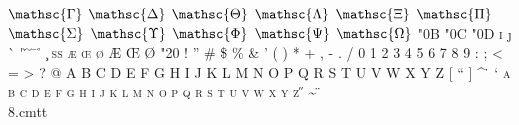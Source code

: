 \documentclass{article}
\begin{document}
\noindent $\mathsc{\Gamma}$ $\mathsc{\Delta}$ $\mathsc{\Theta}$ $\mathsc{\Lambda}$ $\mathsc{\Xi}$ $\mathsc{\Pi}$ $\mathsc{\Sigma}$ $\mathsc{\Upsilon}$ $\mathsc{\Phi}$ $\mathsc{\Psi}$ $\mathsc{\Omega}$ \selectfont\char"0B \selectfont\char"0C \selectfont\char"0D \textsc{\textexclamdown} \textsc{\textquestiondown} \textsc{\i} \textsc{\j} \textsc{\`} \textsc{\'} \textsc{\v} \textsc{\u} \textsc{\=} \textsc{\r} \textsc{\c} \textsc{\ss} \textsc{\ae} \textsc{\oe} \textsc{\o} \textsc{\AE} \textsc{\OE} \textsc{\O} \textsc{\selectfont\char"20} \textsc{!} \textsc{\textquotedblright} \textsc{\#} \textsc{\$} \textsc{\%} \textsc{\&} \textsc{'} \textsc{(} \textsc{)} \textsc{*} \textsc{+} \textsc{,} \textsc{-} \textsc{.} \textsc{/} \textsc{0} \textsc{1} \textsc{2} \textsc{3} \textsc{4} \textsc{5} \textsc{6} \textsc{7} \textsc{8} \textsc{9} \textsc{:} \textsc{;} \textsc{<} \textsc{=} \textsc{>} \textsc{?} \textsc{@} \textsc{A} \textsc{B} \textsc{C} \textsc{D} \textsc{E} \textsc{F} \textsc{G} \textsc{H} \textsc{I} \textsc{J} \textsc{K} \textsc{L} \textsc{M} \textsc{N} \textsc{O} \textsc{P} \textsc{Q} \textsc{R} \textsc{S} \textsc{T} \textsc{U} \textsc{V} \textsc{W} \textsc{X} \textsc{Y} \textsc{Z} \textsc{[} \textsc{\textquotedblleft} \textsc{]} \textsc{\^} \textsc{\.} \textsc{\textquoteleft} \textsc{a} \textsc{b} \textsc{c} \textsc{d} \textsc{e} \textsc{f} \textsc{g} \textsc{h} \textsc{i} \textsc{j} \textsc{k} \textsc{l} \textsc{m} \textsc{n} \textsc{o} \textsc{p} \textsc{q} \textsc{r} \textsc{s} \textsc{t} \textsc{u} \textsc{v} \textsc{w} \textsc{x} \textsc{y} \textsc{z} \textsc{\textendash} \textsc{\textemdash} \textsc{\H} \textsc{\~} \textsc{\"}\\
8.cmtt\\
\end{document}
